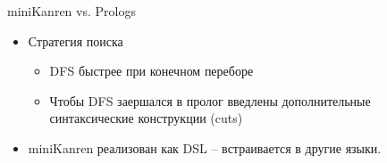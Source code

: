 \documentclass[10pt, mathserif]{beamer}
\let\\\tabularnewline
\let\\\tabularnewline
\newcommand{\inml}[1]{\mbox{\lstinline{#1}}}
\theoremstyle{definition}
\begin{document}
% 
% 

\begin{frame}[fragile]{miniKanren vs. Prologs}
\begin{itemize}
  \item Стратегия поиска
      \begin{itemize}
	\item DFS быстрее при конечном переборе
	\item Чтобы DFS заершался в пролог введлены дополнительные синтаксические конструкции (cuts)
      \end{itemize}
  \item miniKanren реализован как DSL -- встраивается в другие языки.
\end{itemize}
\end{frame}
\end{document}
